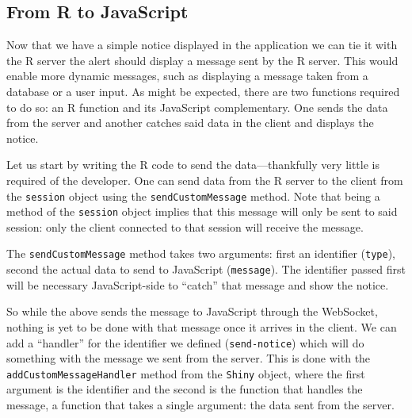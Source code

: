 \documentclass[10pt,]{krantz}
\makeatletter
\newenvironment{Shaded}{\begin{snugshade}}{\end{snugshade}}
\newcommand{\CommentTok}[1]{\textcolor[rgb]{0.37,0.37,0.37}{\textit{#1}}}
\newcommand{\ControlFlowTok}[1]{\textcolor[rgb]{0.27,0.27,0.27}{\textbf{#1}}}
\newcommand{\DataTypeTok}[1]{\textcolor[rgb]{0.27,0.27,0.27}{#1}}
\newcommand{\KeywordTok}[1]{\textcolor[rgb]{0.27,0.27,0.27}{\textbf{#1}}}
\newcommand{\NormalTok}[1]{#1}
\newcommand{\OperatorTok}[1]{\textcolor[rgb]{0.43,0.43,0.43}{\textbf{#1}}}
\newcommand{\StringTok}[1]{\textcolor[rgb]{0.5,0.5,0.5}{#1}}
\newenvironment{kframe}{%
\medskip{}
\setlength{\fboxsep}{.8em}
 \def\at@end@of@kframe{}%
 \ifinner\ifhmode%
  \def\at@end@of@kframe{\end{minipage}}%
  \begin{minipage}{\columnwidth}%
 \fi\fi%
 \def\FrameCommand##1{\hskip\@totalleftmargin \hskip-\fboxsep
 \colorbox{shadecolor}{##1}\hskip-\fboxsep
     \hskip-\linewidth \hskip-\@totalleftmargin \hskip\columnwidth}%
 \MakeFramed {\advance\hsize-\width
   \@totalleftmargin\z@ \linewidth\hsize
   \@setminipage}}%
 {\par\unskip\endMakeFramed%
 \at@end@of@kframe}
\renewenvironment{Shaded}{\begin{kframe}}{\end{kframe}}
\makeatother
\begin{document}
\hypertarget{shiny-intro-r-to-js}{%
\subsection{From R to JavaScript}\label{shiny-intro-r-to-js}}

Now that we have a simple notice displayed in the application we can tie it with the R server the alert should display a message sent by the R server. This would enable more dynamic messages, such as displaying a message taken from a database or a user input. As might be expected, there are two functions required to do so: an R function and its JavaScript complementary. One sends the data from the server and another catches said data in the client and displays the notice.

Let us start by writing the R code to send the data---thankfully very little is required of the developer. One can send data from the R server to the client from the \texttt{session} object using the \texttt{sendCustomMessage} method. Note that being a method of the \texttt{session} object implies that this message will only be sent to said session: only the client connected to that session will receive the message.

The \texttt{sendCustomMessage} method takes two arguments: first an identifier (\texttt{type}), second the actual data to send to JavaScript (\texttt{message}). The identifier passed first will be necessary JavaScript-side to ``catch'' that message and show the notice.

\begin{Shaded}
\end{Shaded}

So while the above sends the message to JavaScript through the WebSocket, nothing is yet to be done with that message once it arrives in the client. We can add a ``handler'' for the identifier we defined (\texttt{send-notice}) which will do something with the message we sent from the server. This is done with the \texttt{addCustomMessageHandler} method from the \texttt{Shiny} object, where the first argument is the identifier and the second is the function that handles the message, a function that takes a single argument: the data sent from the server.
\end{document}
